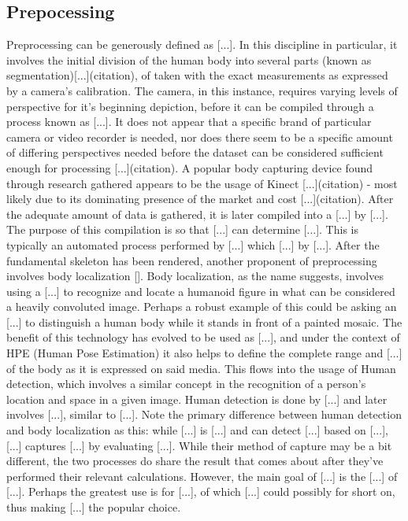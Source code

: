 \documentclass[12pt]{extarticle}
\begin{document}
\subsection{Prepocessing}
Preprocessing can be generously defined as [...]. In this discipline in particular, it involves the initial division of the human body into several parts (known as segmentation)[...](citation), of taken with the exact measurements as expressed by a camera's calibration. The camera, in this instance, requires varying levels of perspective for it's beginning depiction, before it can be compiled through a process known as [...]. It does not appear that a specific brand of particular camera or video recorder is needed, nor does there seem to be a specific amount of differing perspectives needed before the dataset can be considered sufficient enough for processing [...](citation). A popular body capturing device found through research gathered appears to be the usage of Kinect [...](citation) - most likely due to its dominating presence of the market and cost [...](citation).
After the adequate amount of data is gathered, it is later compiled into a [...] by [...]. The purpose of this compilation is so that [...] can determine [...]. This is typically an automated process performed by [...] which [...] by [...].
After the fundamental skeleton has been rendered, another proponent of preprocessing involves body localization []. Body localization, as the name suggests, involves using a [...] to recognize and locate a humanoid figure in what can be considered a heavily convoluted image. Perhaps a robust example of this could be asking an [...] to distinguish a human body while it stands in front of a painted mosaic. The benefit of this technology has evolved to be used as [...], and under the context of HPE (Human Pose Estimation) it also helps to define the complete range and [...] of the body as it is expressed on said media.
This flows into the usage of Human detection, which involves a similar concept in the recognition of a person's location and space in a given image. Human detection is done by [...] and later involves [...], similar to [...]. Note the primary difference between human detection and body localization as this: while [...] is [...] and can detect [...] based on [...], [...] captures [...] by evaluating [...]. While their method of capture may be a bit different, the two processes do share the result that comes about after they've performed their relevant calculations. However, the main goal of [...] is the [...] of [...]. Perhaps the greatest use is for [...], of which [...] could possibly for short on, thus making [...] the popular choice.
\end{document}

